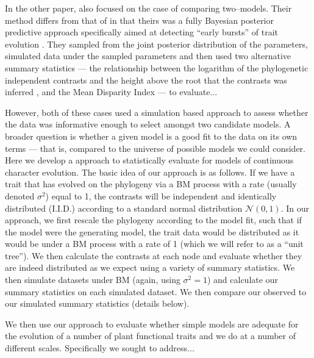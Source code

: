 \documentclass[12pt]{article}
\begin{document}
In the other paper, \citet{SlaterPennell} also focused on the case of comparing two--models. Their method differs from that of \citet{Boettiger2012} in that theirs was a fully Bayesian posterior predictive approach specifically aimed at detecting ``early bursts'' of trait evolution \citep[\textit{sensu}][]{Simpson1944, Simpson1953, Harmon2010}. They sampled from the joint posterior distribution of the parameters, simulated data under the sampled parameters and then used two alternative summary statistics --- the relationship between the logarithm of the phylogenetic independent contrasts and the height above the root that the contrasts was inferred \citep[a.k.a. the ``node height test'';][]{FreckletonHarvey2006}, and the Mean Disparity Index \citep[MDI;][]{Harmon2003, Slater2010} --- to evaluate...

However, both of these cases used a simulation based approach to assess whether the data was informative enough to select amongst two candidate models. A broader question is whether a given model is a good fit to the data on its own terms --- that is, compared to the universe of possible models we could consider. Here we develop a approach to statistically evaluate for models of continuous character evolution. The basic idea of our approach is as follows. If we have a trait that has evolved on the phylogeny via a BM process with a rate (usually denoted $\sigma^2$) equal to 1, the contrasts \citep[\textit{sensu}][see below]{Felsenstein1985} will be independent and identically distributed (I.I.D.) according to a standard normal distribution $\mathcal{N}(0,1)$. In our approach, we first rescale the phylogeny according to the model fit, such that if the model were the generating model, the trait data would be distributed as it would be under a BM process with a rate of 1 (which we will refer to as a ``unit tree''). We then calculate the contrasts at each node and evaluate whether they are indeed distributed as we expect using a variety of summary statistics. We then simulate datasets under BM (again, using $\sigma^2 = 1$) and calculate our summary statistics on each simulated dataset. We then compare our observed to our simulated summary statistics (details below). 

We then use our approach to evaluate whether simple models are adequate for the evolution of a number of plant functional traits and we do at a number of different scales. Specifically we sought to address...
\end{document}
